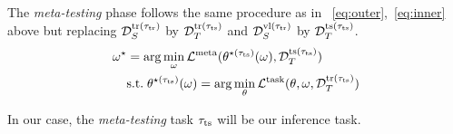 The {\it meta-testing} phase follows the same procedure as in ~\cref{eq:outer},~\cref{eq:inner} above but replacing 
${\cal D}_{S}^{\rm tr(\tau_{\rm tr})}$ by ${\cal D}_{T}^{\rm tr(\tau_{\rm ts})}$ and
${\cal D}_{S}^{\rm vl(\tau_{\rm tr})}$ by ${\cal D}_{T}^{\rm ts(\tau_{\rm ts})}$. 
\begin{align}
    \omega^{\star} &= \arg\min_{\omega} {\cal L}^{\rm meta} (\theta^{\star (\tau_{\rm ts})}(\omega), {\cal D}_{T}^{{\rm ts}{(\tau_{\rm ts})}  }) \label{eq:ts_outer} \\
    &{\rm s.t.}\;  \theta^{\star (\tau_{\rm ts})}(\omega) = \arg\min_{\theta} {\cal L}^{\rm task}(\theta,\omega, {\cal D}_{T}^{{\rm tr}  (\tau_{\rm ts})} ) \label{eq:ts_inner}
\end{align}

In our case, the {\it meta-testing} task $\tau_{\rm ts}$ will be our inference task.

